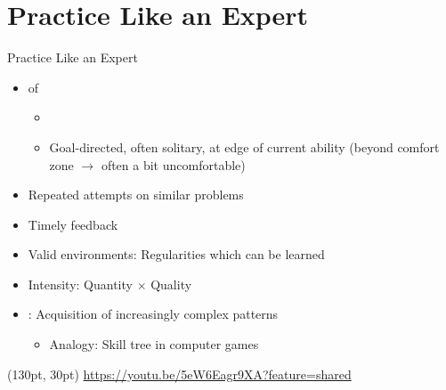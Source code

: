 \documentclass{ercisbeamer}
\begin{document}
\section{Practice Like an Expert}
\begin{frame}{Practice Like an Expert}
    \begin{tbox}
        \begin{itemize}
            \item {} of  
            \begin{itemize}
                \item {}
                \item Goal-directed, often solitary, at edge of current ability (beyond comfort zone $\rightarrow$ often a bit uncomfortable)
            \end{itemize}
            \item Repeated attempts on similar problems
            \item Timely feedback
            \item Valid environments: Regularities which can be learned
            \item Intensity: Quantity $\times$ Quality
            \item {}: Acquisition of increasingly complex patterns
            \begin{itemize}
                \item Analogy: Skill tree in computer games
            \end{itemize}
        \end{itemize}
    \end{tbox}
    \begin{textblock*}{200pt}(130pt, 30pt)
        \tiny \url{https://youtu.be/5eW6Eagr9XA?feature=shared}
    \end{textblock*}
\end{frame}
\setbgimage{}
\end{document}
